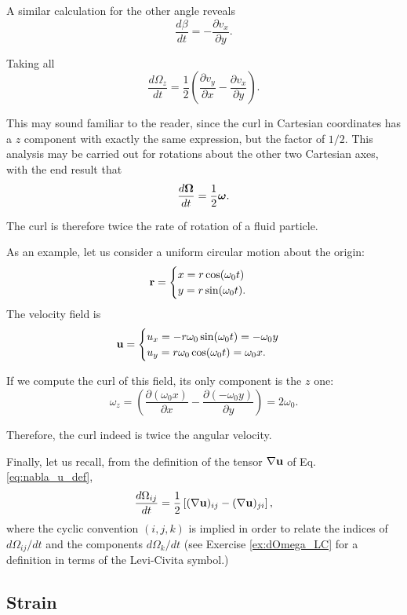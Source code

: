 A similar calculation for the other angle reveals
\[
\frac{d \beta}{dt} = - \frac{\partial v_x}{\partial y}  .
\]

Taking all
\[
\frac{d\Omega_z}{dt} = \frac12
\left(
  \frac{\partial v_y}{\partial x}  -
  \frac{\partial v_x}{\partial y}
\right) .
\]

This may sound familiar to the reader, since the curl in Cartesian
coordinates has a $z$ component with exactly the same expression, but
the factor of $1/2$. This analysis may be carried out for
rotations about the other two Cartesian axes, with the end result that
\[
 \frac{d \bm{\Omega} }{dt} = \frac12 \bm{\omega} .
\]

The curl is therefore twice the rate of rotation of a fluid particle.


As an example, let us consider a uniform circular motion about the
origin:
\[
\mathbf{r} =
\begin{cases}
x =r \cos(\omega_0 t) \\
y =r \sin(\omega_0 t) .
\end{cases}
\]
The velocity field is
\[
\mathbf{u} =
\begin{cases}
u_x= -r \omega_0 \sin(\omega_0 t) = -\omega_0 y \\
u_y=  r \omega_0 \cos(\omega_0 t) =  \omega_0 x.
\end{cases}
\]

If we compute the curl of this field, its only component is the $z$ one:
\[
\omega_z= \left(
  \frac{\partial (\omega_0  x)}{\partial x}  -
  \frac{\partial (- \omega_0 y) }{\partial y}
\right) =  2 \omega_0 . 
\]

Therefore, the curl indeed is twice the angular velocity.

Finally, let us recall, from the definition of the tensor
$\nabla \mathbf{u}$ of Eq. \ref{eq:nabla_u_def},
\begin{equation}
  \label{eq:dOmega_as_grad_u}
  \frac{d\Omega_{ij}}{dt} = \frac12
  \left[
    (\nabla \mathbf{u})_{ij} -
    (\nabla \mathbf{u})_{ji}
  \right] ,  
\end{equation}
%
where the cyclic convention $(i,j,k)$ is implied in order to relate
the indices of $d\Omega_{ij}/ dt$ and the components $d\Omega_k/ dt$
(see Exercise \ref{ex:dOmega_LC} for a definition in terms of the
Levi-Civita symbol.)


\subsection{Strain}

